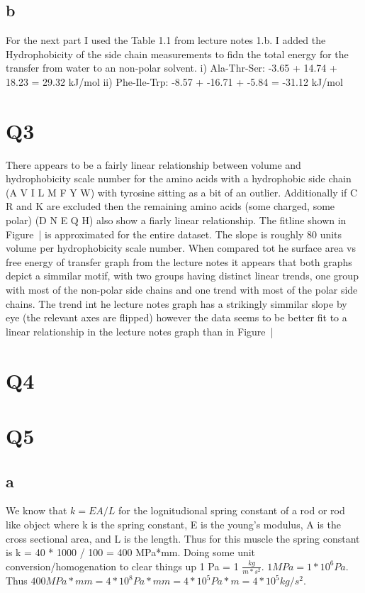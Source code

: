 \documentclass[12pt]{article}
\begin{document}
\subsection{b}
For the next part I used the Table 1.1 from lecture notes 1.b. I added the Hydrophobicity of the side chain measurements to fidn the total energy for the transfer from water to an non-polar solvent.
i) Ala-Thr-Ser: -3.65 + 14.74 + 18.23 = 29.32 kJ/mol
ii) Phe-Ile-Trp: -8.57 + -16.71 + -5.84 = -31.12 kJ/mol


\section{Q3}
There appears to be a fairly linear relationship between volume and hydrophobicity scale number for the amino acids with a hydrophobic side chain (A V I L M F Y W) with tyrosine sitting as a bit of an outlier. Additionally if C R and K are excluded then the remaining amino acids (some charged, some polar) (D N E Q H) also show a fiarly linear relationship. The fitline shown in Figure~| is approximated for the entire dataset. The slope is roughly 80 units volume per hydrophobicity scale number. When compared tot he surface area vs free energy of transfer graph from the lecture notes it appears that both graphs depict a simmilar motif, with two groups having distinct linear trends, one group with most of the non-polar side chains and one trend with most of the polar side chains. The trend int he lecture notes graph has a strikingly simmilar slope by eye (the relevant axes are flipped) however the data seems to be  better fit to a linear relationship in the lecture notes graph than in Figure~|

\section{Q4}



\section{Q5}
\subsection{a}
We know that $k = {EA}/L$ for the lognitudional spring constant of a rod or rod like object where k is the spring constant, E is the young's modulus, A is the cross sectional area, and L is the length. Thus for this muscle the spring constant is k = 40 * 1000 / 100 = 400 MPa*mm. Doing some unit conversion/homogenation to clear things up 1 Pa = 1 $\frac{kg}{m*s^2}$. $1 MPa = 1*10^6 Pa$. Thus $400 MPa*mm = 4*10^8Pa*mm = 4*10^5 Pa*m = 4*10^5 kg/s^2$.
\end{document}

